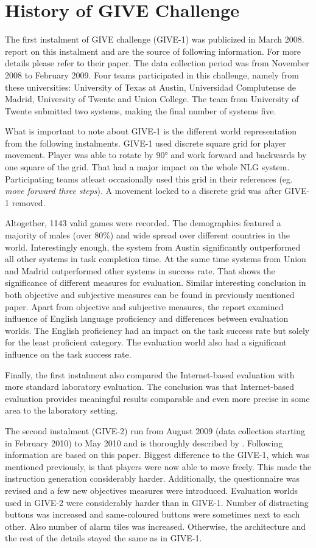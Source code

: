  
\section{History of GIVE Challenge}
The first instalment of GIVE challenge (GIVE-1) was publicized in March 2008. \citep{koller2010first} report on this instalment and are the source of following information. For more details please refer to their paper. The data collection period was from November 2008 to February 2009. Four teams participated in this challenge, namely from these universities: University of Texas at Austin, Universidad Complutense de Madrid, University of Twente and Union College. The team from University of Twente submitted two systems, making the final number of systems five.

What is important to note about GIVE-1 is the different world representation from the following instalments. GIVE-1 used discrete square grid for player movement. Player was able to rotate by 90° and work forward and backwards by one square of the grid. That had a major impact on the whole NLG system. Participating teams atleast occasionally used this grid in their references (eg. \textit{move forward three steps}). A movement locked to a discrete grid was after GIVE-1 removed.

Altogether, 1143 valid games were recorded. The demographics featured a majority of males (over 80\%) and wide spread over different countries in the world. Interestingly enough, the system from Austin significantly outperformed all other systems in task completion time. At the same time systems from Union and Madrid outperformed other systems in success rate. That shows the significance of different measures for evaluation. Similar interesting conclusion in both objective and subjective measures can be found in previously mentioned paper. Apart from objective and subjective measures, the report examined influence of English language proficiency and differences between evaluation worlds. The English proficiency had an impact on the task success rate but solely for the least proficient category. The evaluation world also had a significant influence on the task success rate.

Finally, the first instalment also compared the Internet-based evaluation with more standard laboratory evaluation. The conclusion was that Internet-based evaluation provides meaningful results comparable and even more precise in some area to the laboratory setting.

The second instalment (GIVE-2) run from August 2009 (data collection starting in February 2010) to May 2010 and is thoroughly described by \citep{koller2010report}. Following information are based on this paper. Biggest difference to the GIVE-1, which was mentioned previously, is that players were now able to move freely. This made the instruction generation considerably harder. Additionally, the questionnaire was revised and a few new objectives measures were introduced. Evaluation worlds used in GIVE-2 were considerably harder than in GIVE-1. Number of distracting buttons was increased and same-coloured buttons were sometimes next to each other. Also number of alarm tiles was increased. Otherwise, the architecture and the rest of the details stayed the same as in GIVE-1.

